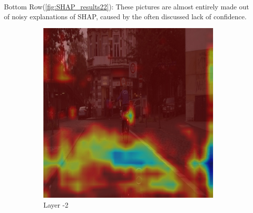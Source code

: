 Bottom Row(\ref{fig:SHAP_results22}): These pictures are almost entirely made out of noisy explanations of SHAP, caused by the often discussed lack of confidence.



\begin{figure}[h!]
    \centering


    \begin{subfigure}[b]{0.49\textwidth}
        \centering
        \includegraphics[width=\textwidth]{figures/bonn_000036_000019_leftImg8bit.pnglayer-2/bonn_000036_000019_leftImg8bit.png_object(0)_heatmap}
        \caption{Layer -2}
        \label{fig:b-2}
    \end{subfigure}
    \hfill
    \begin{subfigure}[b]{0.49\textwidth}
        \centering

\end{subfigure}
\end{figure}
